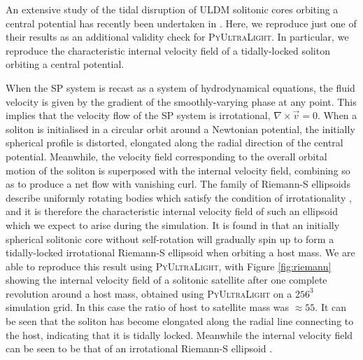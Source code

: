 \documentclass[a4paper,11pt]{article}
\newcommand{\PyUltraLight}{\textsc{PyUltraLight}\xspace}
\begin{document}
An extensive study of the tidal disruption of ULDM solitonic cores orbiting a central potential has recently been undertaken in \cite{Du2018}. Here, we reproduce just one of their results as an additional validity check for \PyUltraLight. In particular, we reproduce the characteristic internal velocity field of a tidally-locked soliton orbiting a central potential. 

When the SP system is recast as a system of hydrodynamical equations, the fluid velocity is given by the gradient of the smoothly-varying phase at any point. This implies that the velocity flow of the SP system is irrotational, $\nabla\times\vec{v}=0$. When a soliton is initialised in a circular orbit around a Newtonian potential, the initially spherical profile is distorted, elongated along the radial direction of the central potential. Meanwhile, the velocity field corresponding to the overall orbital motion of the soliton is superposed with the internal velocity field, combining so as to produce a net flow with vanishing curl. The family of Riemann-S ellipsoids describe uniformly rotating bodies which satisfy the condition of irrotationality \cite{Chandrasekhar1965}, and it is therefore the characteristic internal velocity field of such an ellipsoid which we expect to arise during the simulation. It is found in \cite{Du2018} that an initially spherical solitonic core without self-rotation will gradually spin up to form a tidally-locked irrotational Riemann-S ellipsoid when orbiting a host mass. We are able to reproduce this result using \PyUltraLight, with Figure \ref{fig:riemann} showing the internal velocity field of a solitonic satellite after one complete revolution around a host mass, obtained using \PyUltraLight on a $256^3$ simulation grid. In this case the ratio of host to satellite mass was $\approx 55$. It can be seen that the soliton has become elongated along the radial line connecting to the host, indicating that it is tidally locked. Meanwhile the internal velocity field can be seen to be that of an irrotational Riemann-S ellipsoid \cite{Daller2012}.
\end{document}
